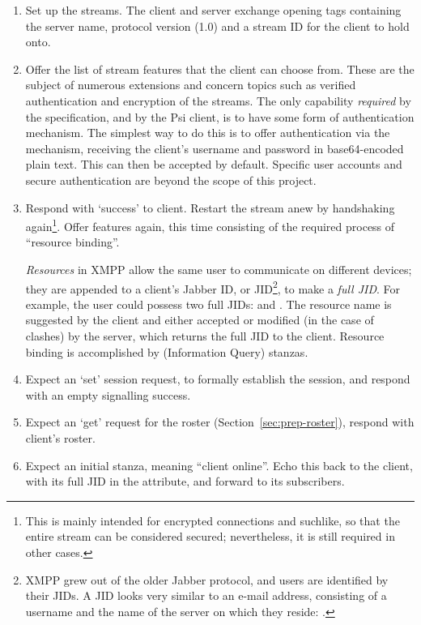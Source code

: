 \begin{enumerate}
  \item Set up the streams. The client and server exchange  opening tags containing the server name, protocol version (1.0) and a stream ID for the client to hold onto.

  \item Offer the list of stream features that the client can choose from. These are the subject of numerous extensions and concern topics such as verified authentication and encryption of the streams. The only capability \emph{required} by the specification, and by the Psi client, is to have some form of authentication mechanism. The simplest way to do this is to offer authentication via the  mechanism, receiving the client's username and password in base64-encoded plain text. This can then be accepted by default. Specific user accounts and secure authentication are beyond the scope of this project.

  \item Respond with `success' to client. Restart the stream anew by handshaking again\footnote{This is mainly intended for encrypted connections and suchlike, so that the entire stream can be considered secured; nevertheless, it is still required in other cases.}. Offer features again, this time consisting of the required process of ``resource binding''.

  \emph{Resources} in XMPP allow the same user to communicate on different devices; they are appended to a client's Jabber ID, or JID\footnote{XMPP grew out of the older Jabber protocol, and users are identified by their JIDs. A JID looks very similar to an e-mail address, consisting of a username and the name of the server on which they reside: .}, to make a \emph{full JID}. For example, the user  could possess two full JIDs:  and . The resource name is suggested by the client and either accepted or modified (in the case of clashes) by the server, which returns the full JID to the client. Resource binding is accomplished by  (Information Query) stanzas.

  \item Expect an  `set' session request, to formally establish the session, and respond with an empty  signalling success.

  \item Expect an  `get' request for the roster (Section~\ref{sec:prep-roster}), respond with client's roster.

  \item Expect an initial  stanza, meaning ``client online''. Echo this back to the client, with its full JID in the  attribute, and forward to its subscribers.
\end{enumerate}


